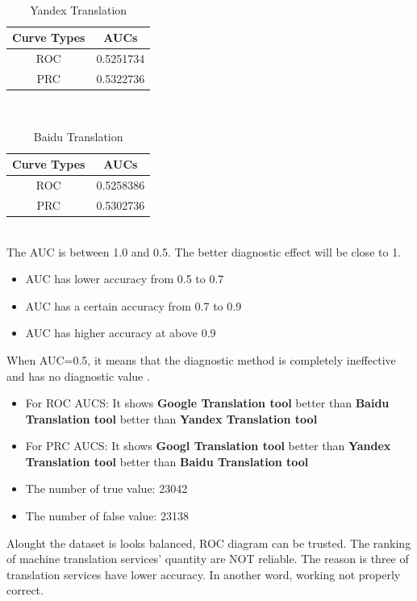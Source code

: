 \documentclass[conference]{IEEEtran}
\begin{document}
\begin{enumerate}
\begin{table}[h]
  \end{table}\\
   \begin{table}[h]
     \caption {Yandex Translation}
     \begin{center}
       \begin{tabular}{|c|c|}
         \hline
         Curve Types & AUCs \\
         \hline\hline
         ROC & 0.5251734 \\
         \hline
         PRC & 0.5322736 \\
         \hline
       \end{tabular}
     \end{center}
   \end{table}\\
  \begin{table}[h]
    \caption {Baidu Translation}
    \begin{center}
      \begin{tabular}{|c|c|}
        \hline
        Curve Types & AUCs \\
        \hline\hline
        ROC & 0.5258386 \\
        \hline
        PRC & 0.5302736 \\
        \hline
      \end{tabular}
    \end{center}
  \end{table}\\
  The AUC is between 1.0 and 0.5. The better diagnostic effect will be close to 1.
  \begin{itemize}
  \item AUC has lower accuracy from 0.5 to 0.7
  \item AUC has a certain accuracy from 0.7 to 0.9
  \item AUC has higher accuracy at above 0.9
  \end{itemize}
  When AUC=0.5, it means that the diagnostic method is completely ineffective
  and has no diagnostic value \cite{baiduROC}.
  \begin{itemize}
  \item For ROC AUCS: It shows \textbf{Google Translation tool} better than
    \textbf{Baidu Translation tool} better than \textbf{Yandex Translation tool}
    \item For PRC AUCS: It shows \textbf{Googl Translation tool} better than
      \textbf{Yandex Translation tool} better than \textbf{Baidu Translation
        tool}
  \end{itemize}

\begin{itemize}
\item The number of true value: 23042
\item The number of false value: 23138
\end{itemize}

\end{enumerate}
Alought the dataset is looks balanced, ROC diagram can be trusted. The ranking
of machine translation services' quantity are NOT reliable. The reason is three of translation services
have lower accuracy. In another word, working not properly correct.
\end{document}
